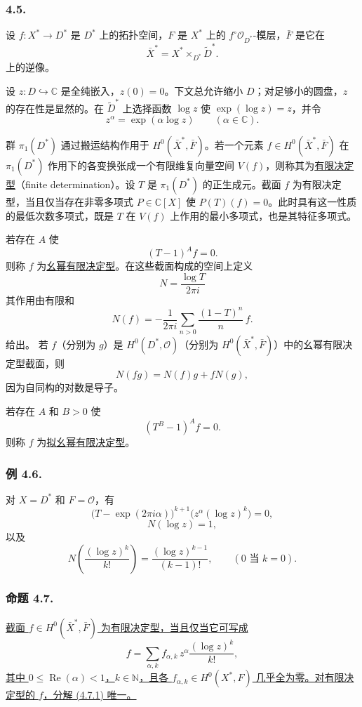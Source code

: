 \subsubsection*{4.5.}
设 $f:X^*\longrightarrow D^*$ 是 $D^*$ 上的拓扑空间，$F$ 是 $X^*$ 上的 $f^\circ\mathcal O_{D^*}$-模层，$\bar F$ 是它在
\[
\bar X^*=X^*\times_{D^*}\widetilde D^*.
\]
上的逆像。

设 $z:D\hookrightarrow\mathbb C$ 是全纯嵌入，$z(0)=0$。下文总允许缩小 $D$；对足够小的圆盘，$z$ 的存在性是显然的。在 $\widetilde D^*$ 上选择函数 $\log z$ 使 $\exp(\log z)=z$，并令
\[
z^\alpha=\exp(\alpha\log z)
\qquad(\alpha\in\mathbb C).
\]

群 $\pi_1(D^*)$ 通过搬运结构作用于 $H^0(\bar X^*,\bar F)$。若一个元素 $f\in H^0(\bar X^*,\bar F)$ 在 $\pi_1(D^*)$ 作用下的各变换张成一个有限维复向量空间 $V(f)$，则称其为\underline{有限决定型}（finite determination）。设 $T$ 是 $\pi_1(D^*)$ 的正生成元。截面 $f$ 为有限决定型，当且仅当存在非零多项式 $P\in\mathbb C[X]$ 使 $P(T)(f)=0$。此时具有这一性质的最低次数多项式，既是 $T$ 在 $V(f)$ 上作用的最小多项式，也是其特征多项式。

若存在 $A$ 使
\[
(T-1)^A f=0.
\]
则称 $f$ 为\underline{幺幂有限决定型}。在这些截面构成的空间上定义
\[
N=\frac{\log T}{2\pi i}
\]
其作用由有限和
\[
N(f)=-\frac1{2\pi i}
\sum_{n>0}\frac{(1-T)^n}{n}\,f.
\]
给出。
若 $f$（分别为 $g$）是 $H^0(D^*,\mathcal O)$（分别为 $H^0(\bar X^*,\bar F)$）中的幺幂有限决定型截面，则
\[
N(fg)=N(f)g+fN(g),
\]
因为自同构的对数是导子。

若存在 $A$ 和 $B>0$ 使
\[
(T^B-1)^A f=0.
\]
则称 $f$ 为\underline{拟幺幂有限决定型}。

\subsubsection*{例 4.6.}
对 $X=D^*$ 和 $F=\mathcal O$，有
\[
\bigl(T-\exp(2\pi i\alpha)\bigr)^{k+1}
  \bigl(z^\alpha(\log z)^k\bigr)=0,
\]
\[
N(\log z)=1,
\]
以及
\[
N\left(\frac{(\log z)^k}{k!}\right)
=\frac{(\log z)^{k-1}}{(k-1)!},
\qquad
(0\text{ 当 }k=0).
\]

\subsubsection*{命题 4.7.}
\underline{截面 $f\in H^0(\bar X^*,\bar F)$ 为有限决定型，当且仅当它可写成}
\begin{equation}\tag{4.7.1}
f=\sum_{\alpha,k}f_{\alpha,k}\,
z^\alpha\frac{(\log z)^k}{k!},
\end{equation}
\underline{其中 $0\leq\operatorname{Re}(\alpha)<1$，$k\in\mathbb N$，且各 $f_{\alpha,k}\in H^0(X^*,F)$ 几乎全为零。对有限决定型的 $f$，分解 (4.7.1) 唯一。}

